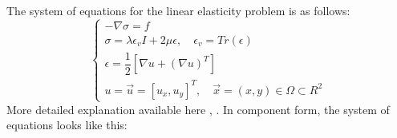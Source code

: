 The system of equations for the linear elasticity problem is as follows:
\begin{equation}
	\label{eq:linear_sys}
	\begin{cases}
		- \nabla \sigma = f \\[10pt]
		\sigma = \lambda \epsilon_v I + 2 \mu \epsilon, \quad \epsilon_v = Tr \left ( \epsilon \right ) \\[10pt]
		\epsilon = \dfrac{1}{2} \left [ \nabla u + \left ( \nabla u\right )^T \right ] \\[10pt]
		u = \vec{u} = \left [ u_x, u_y \right ]^T, \quad \vec{x} = (x, y) \in \Omega \subset R^2
	\end{cases}
\end{equation}
More detailed explanation available here \cite{barber1992elasticity}, \cite{gould1983introduction}.
In component form, the system of equations looks like this:
